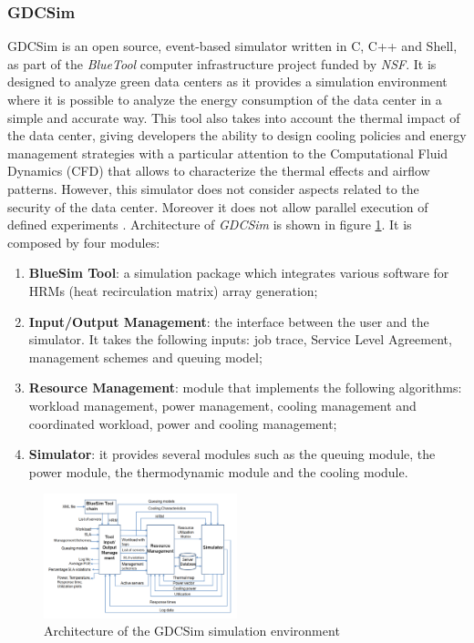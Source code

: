 {\subsubsection*{GDCSim}
GDCSim \cite{gupta2011gdcsim} is an open source, event-based simulator written in C, C++ and Shell, as part of the \emph{BlueTool} computer infrastructure project funded by \emph{NSF}. It is designed to analyze green data centers as it provides a simulation environment where it is possible to analyze the energy consumption of the data center in a simple and accurate way. This tool also takes into account the thermal impact of the data center, giving developers the ability to design cooling policies and energy management strategies with a particular attention to the Computational Fluid Dynamics (CFD) that allows to characterize the thermal effects and airflow patterns. However, this simulator does not consider aspects related to the security of the data center. Moreover it does not allow parallel execution of defined experiments \cite{mansouri2020cloud}.
Architecture of \emph{GDCSim} is shown in figure \ref{fig:gdcsim_arch}. It is composed by four modules:
\begin{enumerate}
    \item \textbf{BlueSim Tool}: a simulation package which integrates various software for HRMs (heat recirculation matrix) array generation;
    \item \textbf{Input/Output Management}: the interface between the user and the simulator. It takes the following inputs: job trace, Service Level Agreement, management schemes and queuing model;
    \item \textbf{Resource Management}: module that implements the following algorithms: workload management, power management, cooling management and coordinated workload, power and cooling management;
    \item \textbf{Simulator}: it provides several modules such as the queuing module, the power module, the thermodynamic module and the cooling module.
\end{enumerate}
\begin{figure}[h]
    \centering
    \includegraphics[width=0.5\textwidth]{capitoli/images/gdcsim_arch.png}
    \caption{Architecture of the GDCSim simulation environment}
    \label{fig:gdcsim_arch}
\end{figure}

}
